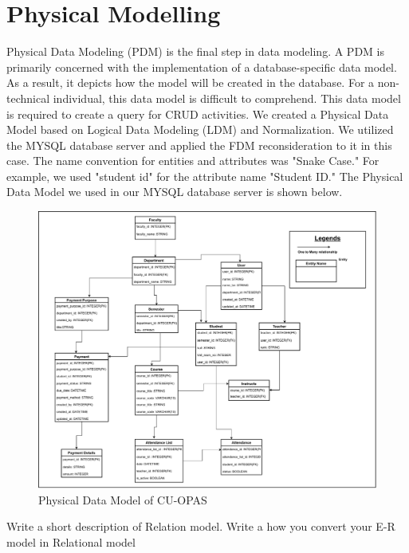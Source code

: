 \section{Physical Modelling}\label{sec:phy}
Physical Data Modeling (PDM) is the final step in data modeling. A PDM is primarily concerned with the implementation of a database-specific data model. As a result, it depicts how the model will be created in the database. For a non-technical individual, this data model is difficult to comprehend. This data model is required to create a query for CRUD activities.
We created a Physical Data Model based on Logical Data Modeling (LDM) and Normalization. We utilized the MYSQL database server and applied the FDM reconsideration to it in this case. The name convention for entities and attributes was "Snake Case." For example, we used "student id" for the attribute name "Student ID." The Physical Data Model we used in our MYSQL database server is shown below.\\

\begin{figure}[H]
    \centering
    \includegraphics[width=1\textwidth]{images/physical}
    \caption{Physical Data Model of CU-OPAS}
    \label{fig:physical}
\end{figure}

Write a short description of Relation model. 
Write a how you convert your E-R model in Relational model
\clearpage